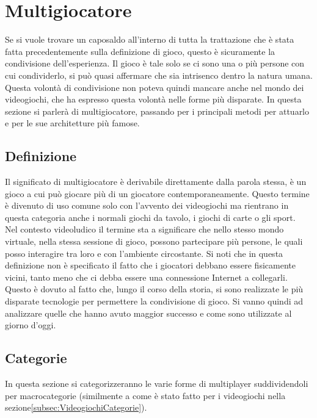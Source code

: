\section{Multigiocatore}\label{sec:Multigiocatore}
    Se si vuole trovare un caposaldo all'interno di tutta la trattazione che è stata fatta precedentemente sulla definizione di gioco, questo è sicuramente la condivisione dell'esperienza. 
    Il gioco è tale solo se ci sono una o più persone con cui condividerlo, si può quasi affermare che sia intrisenco dentro la natura umana. Questa volontà di condivisione 
    non poteva quindi mancare anche nel mondo dei videogiochi, che ha espresso questa volontà nelle forme più disparate. In questa sezione si parlerà di multigiocatore, passando per 
    i principali metodi per attuarlo e per le sue architetture più famose.
    \subsection{Definizione}\label{subsec:MultiDef}
        Il significato di multigiocatore è derivabile direttamente dalla parola stessa, è un gioco a cui può giocare più di un giocatore contemporaneamente. Questo termine è divenuto 
        di uso comune solo con l'avvento dei videogiochi ma rientrano in questa categoria anche i normali giochi da tavolo, i giochi di carte o gli sport.\\
        Nel contesto videoludico il termine sta a significare che nello stesso mondo virtuale, nella stessa sessione di gioco, possono partecipare più persone, le quali posso interagire
        tra loro e con l'ambiente circostante. Si noti che in questa definizione non è specificato il fatto che i giocatori debbano essere fisicamente vicini, tanto meno che ci 
        debba essere una connessione Internet a collegarli. Questo è dovuto al fatto che, lungo il corso della storia, si sono realizzate le più disparate tecnologie per permettere la
        condivisione di gioco. Si vanno quindi ad analizzare quelle che hanno avuto maggior successo e come sono utilizzate al giorno d'oggi.

    \subsection{Categorie}\label{subsec:MultiCategorie}
        In questa sezione si categorizzeranno le varie forme di multiplayer suddividendoli per macrocategorie (similmente a come è stato fatto per i videogiochi nella sezione\ref{subsec:VideogiochiCategorie}).

